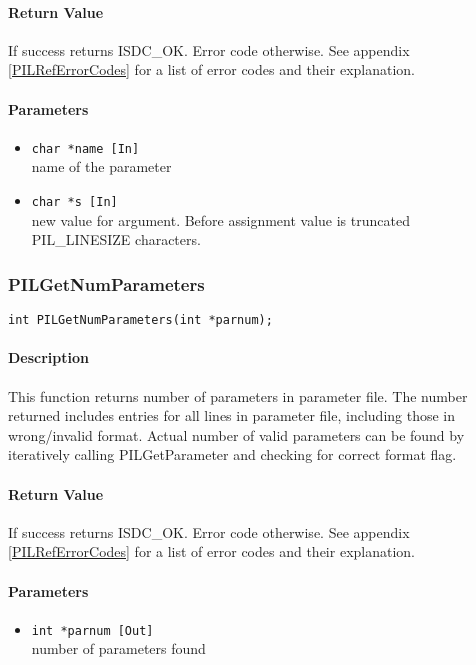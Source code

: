 \paragraph{Return Value\\}
If success returns ISDC\_OK. Error code otherwise. See appendix \ref{PILRefErrorCodes}
for a list of error codes and their explanation.

\paragraph{Parameters}
\begin{itemize}
\item
{\tt char *name [In] } \\
name of the parameter 
\item
{\tt char *s [In] } \\
new value for argument. Before assignment value is truncated PIL\_LINESIZE
characters. 
\end{itemize}



\subsubsection{PILGetNumParameters}

\begin{verbatim}
int PILGetNumParameters(int *parnum);
\end{verbatim}

\paragraph{Description\\}
This function returns number of parameters in parameter file. The number
returned includes entries for all lines in parameter file, including those
in wrong/invalid format. Actual number of valid parameters can be found
by iteratively calling PILGetParameter and checking for correct format
flag.

\paragraph{Return Value\\}
If success returns ISDC\_OK. Error code otherwise. See appendix \ref{PILRefErrorCodes}
for a list of error codes and their explanation.

\paragraph{Parameters}
\begin{itemize}
\item
{\tt int *parnum [Out] } \\
number of parameters found
\end{itemize}

